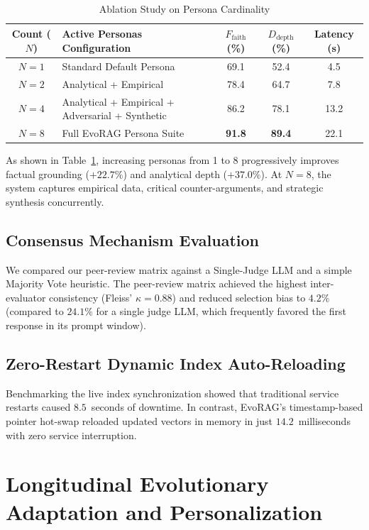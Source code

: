 \begin{table}[H]
\centering
\caption{Ablation Study on Persona Cardinality}
\label{tab:persona_ablation}
\small
\setlength{\tabcolsep}{5pt}
\renewcommand{\arraystretch}{1.3}
\begin{tabularx}{\linewidth}{|c|>{\raggedright\arraybackslash}X|c|c|c|}
\hline
\textbf{Count ($N$)} & \textbf{Active Personas Configuration} & \textbf{$F_{\text{faith}}$ (\%)} & \textbf{$D_{\text{depth}}$ (\%)} & \textbf{Latency (s)} \\
\hline
$N=1$ & Standard Default Persona & 69.1 & 52.4 & 4.5 \\
\hline
$N=2$ & Analytical + Empirical & 78.4 & 64.7 & 7.8 \\
\hline
$N=4$ & Analytical + Empirical + Adversarial + Synthetic & 86.2 & 78.1 & 13.2 \\
\hline
$N=8$ & Full EvoRAG Persona Suite & \textbf{91.8} & \textbf{89.4} & 22.1 \\
\hline
\end{tabularx}
\end{table}

As shown in Table~\ref{tab:persona_ablation}, increasing personas from 1 to 8 progressively improves factual grounding ($+22.7\%$) and analytical depth ($+37.0\%$). At $N=8$, the system captures empirical data, critical counter-arguments, and strategic synthesis concurrently.

\subsection{Consensus Mechanism Evaluation}
We compared our peer-review matrix against a Single-Judge LLM and a simple Majority Vote heuristic. The peer-review matrix achieved the highest inter-evaluator consistency (Fleiss' $\kappa = 0.88$) and reduced selection bias to $4.2\%$ (compared to $24.1\%$ for a single judge LLM, which frequently favored the first response in its prompt window).

\subsection{Zero-Restart Dynamic Index Auto-Reloading}
Benchmarking the live index synchronization showed that traditional service restarts caused $8.5$~seconds of downtime. In contrast, EvoRAG's timestamp-based pointer hot-swap reloaded updated vectors in memory in just $14.2$~milliseconds with zero service interruption.

\section{Longitudinal Evolutionary Adaptation and Personalization}
\label{sec:evolution_results}

